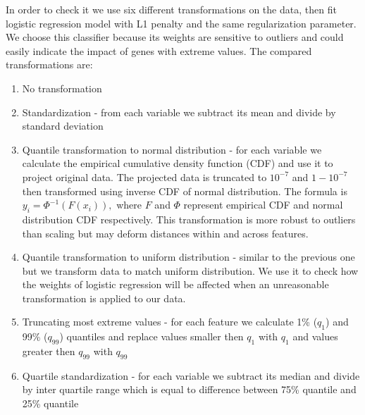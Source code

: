 \documentclass[shortabstract, english, mgr]{iithesis}
\begin{document}
In order to check it we use six different transformations on the data, then fit logistic regression model with L1 penalty and the same regularization parameter. We choose this classifier because its weights are sensitive to outliers and could easily indicate the impact of genes with extreme values. 
The compared transformations are:

\begin{enumerate}
    \item No transformation
    \item Standardization - from each variable we subtract its mean and divide by standard deviation
    \item Quantile transformation to normal distribution - for each variable we calculate the empirical cumulative density function (CDF) and use it to project original data. The projected data is truncated to $10^{-7}$ and $1-10^{-7}$ then transformed using inverse CDF of normal distribution. The formula is $y_{i}=\Phi^{-1}\left(F\left(x_{i}\right)\right),$ where $F$ and $\Phi$ represent empirical CDF and normal distribution CDF respectively. This transformation is more robust to outliers than scaling but may deform distances within and across features.
    \item Quantile transformation to uniform distribution - similar to the previous one but we transform data to match uniform distribution. We use it to check how the weights of logistic regression will be affected when an unreasonable transformation is applied to our data.
    \item Truncating most extreme values - for each feature we calculate 1\% ($q_1$) and 99\% ($q_{99}$) quantiles and replace values smaller then $q_1$ with $q_1$ and values greater then $q_{99}$ with $q_{99}$
    \item Quartile standardization - for each variable we subtract its median and divide by inter quartile range which is equal to difference between 75\% quantile and 25\% quantile
\end{enumerate}
\end{document}
